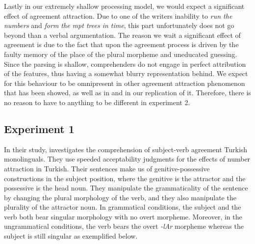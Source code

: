\documentclass[doc]{apa6}
\begin{document}
Lastly in our extremely shallow processing model, we would expect a significant effect of agreement attraction. Due to one of the writers inability to \emph{run the numbers} and \emph{form the mpt trees in time}, this part unfortunately does not go beyond than a verbal argumentation. The reason we wait a significant effect of agreement is due to the fact that upon the agreement process is driven by the faulty memory of the place of the plural morpheme and uneducated guessing. Since the parsing is shallow, comprehenders do not engage in perfect attribution of the features, thus having a somewhat blurry representation behind. We expect for this behaviour to be omnipresent in other agreement attraction phenomenon that has been showed, as well as in \textcite{Lago2018} and in our replication of it. Therefore, there is no reason to have to anything to be different in experiment 2.

\hypertarget{experiment-1}{%
\subsection{Experiment 1}\label{experiment-1}}

In their study, \textcite{Lago2018} investigates the comprehension of subject-verb agreement Turkish monolinguals. They use speeded acceptability judgments for the effects of number attraction in Turkish. Their sentences make us of genitive-possessive constructions in the subject position, where the genitive is the attractor and the possessive is the head noun. They manipulate the grammaticality of the sentence by changing the plural morphology of the verb, and they also manipulate the plurality of the attractor noun. In grammatical conditions, the subject and the verb both bear singular morphology with no overt morpheme. Moreover, in the ungrammatical conditions, the verb bears the overt \emph{-lAr} morpheme whereas the subject is still singular as exemplified below.
\end{document}
